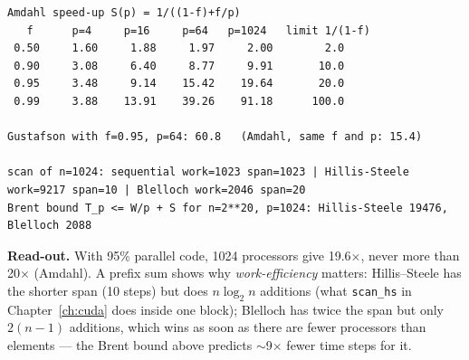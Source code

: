 \documentclass[10pt,a4paper,openany,oneside]{report}
\begin{document}
\begin{lstlisting}[style=out,basicstyle=\ttfamily\scriptsize,title={Captured output}]
Amdahl speed-up S(p) = 1/((1-f)+f/p)
   f      p=4     p=16     p=64   p=1024   limit 1/(1-f)
 0.50     1.60     1.88     1.97     2.00        2.0
 0.90     3.08     6.40     8.77     9.91       10.0
 0.95     3.48     9.14    15.42    19.64       20.0
 0.99     3.88    13.91    39.26    91.18      100.0

Gustafson with f=0.95, p=64: 60.8   (Amdahl, same f and p: 15.4)

scan of n=1024: sequential work=1023 span=1023 | Hillis-Steele work=9217 span=10 | Blelloch work=2046 span=20
Brent bound T_p <= W/p + S for n=2**20, p=1024: Hillis-Steele 19476, Blelloch 2088
\end{lstlisting}
\textbf{Read-out.} With 95\% parallel code, 1024 processors give 19.6$\times$, never more than 20$\times$ (Amdahl). A prefix sum shows why \emph{work-efficiency} matters: Hillis--Steele has the shorter span (10 steps) but does $n\log_2 n$ additions (what \texttt{scan\_hs} in Chapter~\ref{ch:cuda} does inside one block); Blelloch has twice the span but only $2(n-1)$ additions, which wins as soon as there are fewer processors than elements --- the Brent bound above predicts $\sim$9$\times$ fewer time steps for it.
\end{document}

